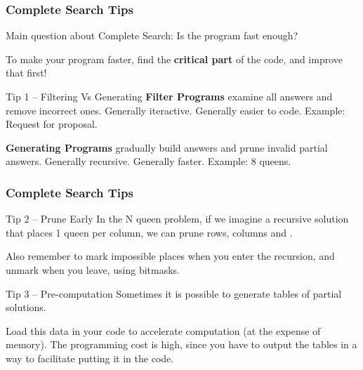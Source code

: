\begin{frame}
  \frametitle{Complete Search Tips}
  Main question about Complete Search: Is the program fast enough?
  \bigskip

  To make your program faster, find the {\bf critical part} of the code, and improve that first!
  \vfill

  \begin{block}{Tip 1 -- Filtering Vs Generating}
    {\bf Filter Programs} examine all answers and remove
    incorrect ones. Generally iteractive. Generally easier to
    code. Example: Request for proposal.

    \bigskip

    {\bf Generating Programs} gradually build answers and
    prune invalid partial answers. Generally recursive. Generally
    faster. Example: 8 queens.
  \end{block}
\end{frame}

\begin{frame}
  \frametitle{Complete Search Tips}
    \begin{block}{Tip 2 -- Prune Early}
      In the N queen problem, if we imagine a recursive solution that
      places 1 queen per column, we can prune rows, columns and
      .

      \smallskip

      Also remember to mark impossible places when you enter the
      recursion, and unmark when you leave, using bitmasks.
    \end{block}

    \vfill

    \begin{block}{Tip 3 -- Pre-computation}
      Sometimes it is possible to generate tables of partial solutions.

      \medskip

      Load this data in your code to accelerate computation (at the
      expense of memory). The programming cost is high, since you have
      to output the tables in a way to facilitate putting it in the
      code.
    \end{block}
\end{frame}


